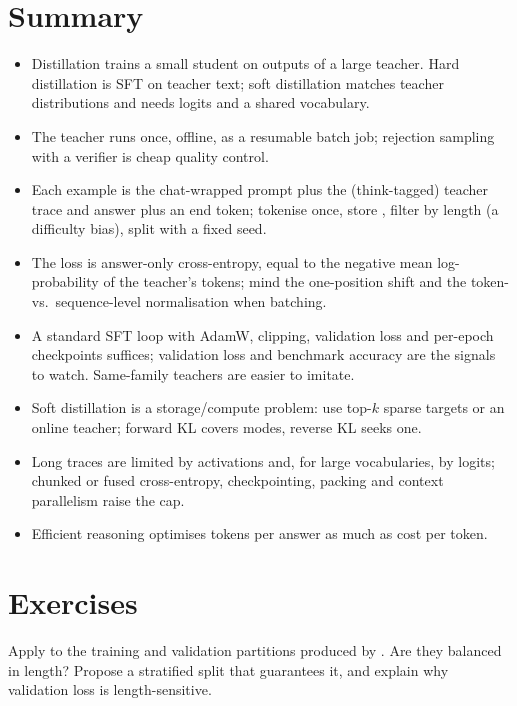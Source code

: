 \section{Summary}\label{sec:distill:summary}
\begin{itemize}
\item Distillation trains a small student on outputs of a large teacher. Hard distillation is
SFT on teacher text; soft distillation matches teacher distributions and needs logits and a
shared vocabulary.
\item The teacher runs once, offline, as a resumable batch job; rejection sampling with a
verifier is cheap quality control.
\item Each example is the chat-wrapped prompt plus the (think-tagged) teacher trace and answer
plus an end token; tokenise once, store , filter by length (a difficulty
bias), split with a fixed seed.
\item The loss is answer-only cross-entropy, equal to the negative mean log-probability of the
teacher's tokens; mind the one-position shift and the token- vs.\ sequence-level normalisation
when batching.
\item A standard SFT loop with AdamW, clipping, validation loss and per-epoch checkpoints
suffices; validation loss and benchmark accuracy are the signals to watch. Same-family teachers
are easier to imitate.
\item Soft distillation is a storage/compute problem: use top-$k$ sparse targets or an online
teacher; forward KL covers modes, reverse KL seeks one.
\item Long traces are limited by activations and, for large vocabularies, by logits; chunked or
fused cross-entropy, checkpointing, packing and context parallelism raise the cap.
\item Efficient reasoning optimises tokens per answer as much as cost per token.
\end{itemize}

\section{Exercises}\label{sec:distill:exercises}

\begin{exercise}
Apply  to the training and validation partitions produced by
. Are they balanced in length? Propose a stratified split that guarantees
it, and explain why validation loss is length-sensitive.
\end{exercise}

